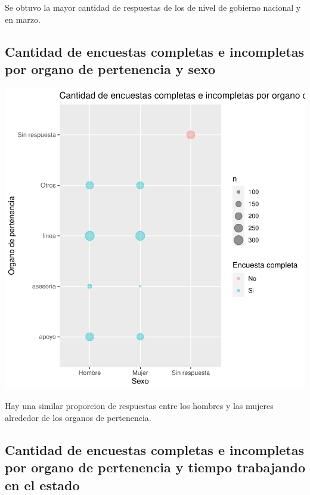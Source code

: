\documentclass{article}
\begin{document}
Se obtuvo la mayor cantidad de respuestas de los de nivel de gobierno nacional y en marzo.

\subsection{Cantidad de encuestas completas e incompletas por organo de pertenencia y sexo}

\includegraphics{seguimientov3-060}

Hay una similar proporcion de respuestas entre los hombres y las mujeres alrededor de los organos de pertenencia.

\subsection{Cantidad de encuestas completas e incompletas por organo de pertenencia y tiempo trabajando en el estado}
\end{document}
